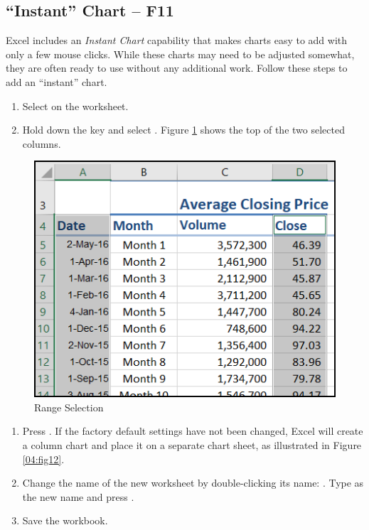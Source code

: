\subsection{``Instant'' Chart – F11}

Excel includes an \textit{Instant Chart} capability that makes charts easy to add with only a few mouse clicks. While these charts may need to be adjusted somewhat, they are often ready to use without any additional work. Follow these steps to add an ``instant'' chart.

\begin{enumerate}
	\item Select  on the  worksheet.
	\item Hold down the  key and select . Figure \ref{04:fig11} shows the top of the two selected columns.
\end{enumerate}

\begin{figure}[H]
	\centering
	\includegraphics[width=\maxwidth{.65\linewidth}]{gfx/ch04_fig11}
	\caption{Range Selection}
	\label{04:fig11}
\end{figure}

\begin{enumerate}[resume]
	\item Press . If the factory default settings have not been changed, Excel will create a column chart and place it on a separate chart sheet, as illustrated in Figure \ref{04:fig12}.
	\item Change the name of the new worksheet by double-clicking its name: . Type  as the new name and press .
	\item Save the workbook.
\end{enumerate}

